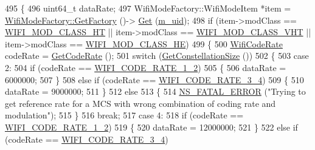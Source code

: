 \begin{DoxyCode}
495 \{
496   uint64\_t dataRate;
497   WifiModeFactory::WifiModeItem *item = \hyperlink{classns3_1_1WifiModeFactory_a9c6f695d733355dee8d74bd1709868fc}{WifiModeFactory::GetFactory} ()->
      \hyperlink{classns3_1_1WifiModeFactory_a3086868810ff4347e31c63027726f544}{Get} (\hyperlink{classns3_1_1WifiMode_ad63e4633ba59d019abfb07de0858727f}{m\_uid});
498   \textcolor{keywordflow}{if} (item->modClass == \hyperlink{namespacens3_aa999e1221606a2b21b1eb33c2007c217a6ac45cac36cc4454649435d24ebf349c}{WIFI\_MOD\_CLASS\_HT} || item->modClass == 
      \hyperlink{namespacens3_aa999e1221606a2b21b1eb33c2007c217a9863e4342bf5c238c74dddfc4d96c67e}{WIFI\_MOD\_CLASS\_VHT} || item->modClass == \hyperlink{namespacens3_aa999e1221606a2b21b1eb33c2007c217abfa4f7272510045a9b43e8ac27ac13b0}{WIFI\_MOD\_CLASS\_HE})
499     \{
500       \hyperlink{namespacens3_aeaf3a86fd4bdb7829955238fba43e2ad}{WifiCodeRate} codeRate = \hyperlink{classns3_1_1WifiMode_a41fcb1abd2aa488145f2f43ca9ba8e1d}{GetCodeRate} ();
501       \textcolor{keywordflow}{switch} (\hyperlink{classns3_1_1WifiMode_a28bbc436203fd3332da6cc61909af8f1}{GetConstellationSize} ())
502         \{
503         \textcolor{keywordflow}{case} 2:
504           \textcolor{keywordflow}{if} (codeRate == \hyperlink{namespacens3_aeaf3a86fd4bdb7829955238fba43e2ada66dfa017f6a74bcb72cdccfee778e90b}{WIFI\_CODE\_RATE\_1\_2})
505             \{
506               dataRate = 6000000;
507             \}
508           \textcolor{keywordflow}{else} \textcolor{keywordflow}{if} (codeRate == \hyperlink{namespacens3_aeaf3a86fd4bdb7829955238fba43e2ada705b2eb134214c4f87c2b07dfb59046a}{WIFI\_CODE\_RATE\_3\_4})
509             \{
510               dataRate = 9000000;
511             \}
512           \textcolor{keywordflow}{else}
513             \{
514               \hyperlink{group__fatal_ga5131d5e3f75d7d4cbfd706ac456fdc85}{NS\_FATAL\_ERROR} (\textcolor{stringliteral}{"Trying to get reference rate for a MCS with wrong combination
       of coding rate and modulation"});
515             \}
516           \textcolor{keywordflow}{break};
517         \textcolor{keywordflow}{case} 4:
518           \textcolor{keywordflow}{if} (codeRate == \hyperlink{namespacens3_aeaf3a86fd4bdb7829955238fba43e2ada66dfa017f6a74bcb72cdccfee778e90b}{WIFI\_CODE\_RATE\_1\_2})
519             \{
520               dataRate = 12000000;
521             \}
522           \textcolor{keywordflow}{else} \textcolor{keywordflow}{if} (codeRate == \hyperlink{namespacens3_aeaf3a86fd4bdb7829955238fba43e2ada705b2eb134214c4f87c2b07dfb59046a}{WIFI\_CODE\_RATE\_3\_4})

\end{DoxyCode}
